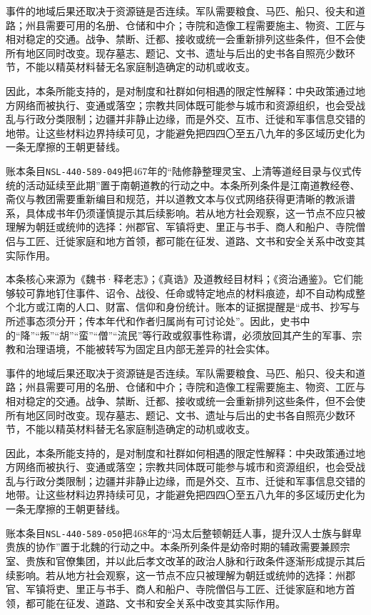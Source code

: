 事件的地域后果还取决于资源链是否连续。军队需要粮食、马匹、船只、役夫和道路；州县需要可用的名册、仓储和中介；寺院和造像工程需要施主、物资、工匠与相对稳定的交通。战争、禁断、迁都、接收或统一会重新排列这些条件，但不会使所有地区同时改变。现存墓志、题记、文书、遗址与后出的史书各自照亮少数环节，不能以精英材料替无名家庭制造确定的动机或收支。

因此，本条所能支持的，是对制度和社群如何相遇的限定性解释：中央政策通过地方网络而被执行、变通或落空；宗教共同体既可能参与城市和资源组织，也会受战乱与行政分类限制；边疆并非静止边缘，而是外交、互市、迁徙和军事信息交错的地带。让这些材料边界持续可见，才能避免把四四〇至五八九年的多区域历史化为一条无摩擦的王朝更替线。

账本条目\texttt{NSL-440-589-049}把467年的“陆修静整理灵宝、上清等道经目录与仪式传统的活动延续至此期”置于南朝道教的行动之中。本条所列条件是江南道教经卷、斋仪与教团需要重新编目和规范，并以道教文本与仪式网络获得更清晰的教派谱系，具体成书年仍须谨慎提示其后续影响。若从地方社会观察，这一节点不应只被理解为朝廷或统帅的选择：州郡官、军镇将吏、里正与书手、商人和船户、寺院僧侣与工匠、迁徙家庭和地方首领，都可能在征发、道路、文书和安全关系中改变其实际作用。

本条核心来源为《魏书·释老志》；《真诰》及道教经目材料；《资治通鉴》。它们能够较可靠地钉住事件、诏令、战役、任命或特定地点的材料痕迹，却不自动构成整个北方或江南的人口、财富、信仰和身份统计。账本的证据提醒是“成书、抄写与所述事态须分开；传本年代和作者归属尚有可讨论处”。因此，史书中的“降”“叛”“胡”“蛮”“僧”“流民”等行政或叙事性称谓，必须放回其产生的军事、宗教和治理语境，不能被转写为固定且内部无差异的社会实体。

事件的地域后果还取决于资源链是否连续。军队需要粮食、马匹、船只、役夫和道路；州县需要可用的名册、仓储和中介；寺院和造像工程需要施主、物资、工匠与相对稳定的交通。战争、禁断、迁都、接收或统一会重新排列这些条件，但不会使所有地区同时改变。现存墓志、题记、文书、遗址与后出的史书各自照亮少数环节，不能以精英材料替无名家庭制造确定的动机或收支。

因此，本条所能支持的，是对制度和社群如何相遇的限定性解释：中央政策通过地方网络而被执行、变通或落空；宗教共同体既可能参与城市和资源组织，也会受战乱与行政分类限制；边疆并非静止边缘，而是外交、互市、迁徙和军事信息交错的地带。让这些材料边界持续可见，才能避免把四四〇至五八九年的多区域历史化为一条无摩擦的王朝更替线。

账本条目\texttt{NSL-440-589-050}把468年的“冯太后整顿朝廷人事，提升汉人士族与鲜卑贵族的协作”置于北魏的行动之中。本条所列条件是幼帝时期的辅政需要兼顾宗室、贵族和官僚集团，并以此后孝文改革的政治人脉和行政条件逐渐形成提示其后续影响。若从地方社会观察，这一节点不应只被理解为朝廷或统帅的选择：州郡官、军镇将吏、里正与书手、商人和船户、寺院僧侣与工匠、迁徙家庭和地方首领，都可能在征发、道路、文书和安全关系中改变其实际作用。


